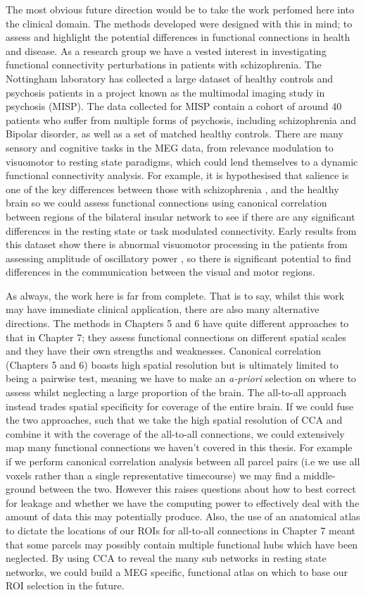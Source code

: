The most obvious future direction would be to take the work perfomed here into the clinical domain. The methods developed were designed with this in mind; to assess and highlight the potential differences in functional connections in health and disease. As a research group we have a vested interest in investigating functional connectivity perturbations in patients with schizophrenia. The Nottingham laboratory has collected a large dataset of healthy controls and psychosis patients in a project known as the multimodal imaging study in psychosis (MISP). The data collected for MISP contain a cohort of around 40 patients who suffer from multiple forms of psychosis, including schizophrenia and Bipolar disorder, as well as a set of matched healthy controls. There are many sensory and cognitive tasks in the MEG data, from relevance modulation to visuomotor to resting state paradigms, which could lend themselves to a dynamic functional connectivity analysis. For example, it is hypothesised that salience is one of the key differences between those with schizophrenia \citep{Kapur2003}, and the healthy brain so we could assess functional connections using canonical correlation between regions of the bilateral insular network to see if there are any significant differences in the resting state or task modulated connectivity. Early results from this dataset show there is abnormal visuomotor processing in the patients from assessing amplitude of oscillatory power \citep{Robson2015}, so there is significant potential to find differences in the communication between the visual and motor regions.

As always, the work here is far from complete. That is to say, whilst this work may have immediate clinical application, there are also many alternative directions. The methods in Chapters 5 and 6 have quite different approaches to that in Chapter 7; they assess functional connections on different spatial scales and they have their own strengths and weaknesses. Canonical correlation (Chapters 5 and 6) boasts high spatial resolution but is ultimately limited to being a pairwise test, meaning we have to make an \textit{a-priori} selection on where to assess whilst neglecting a large proportion of the brain. The all-to-all approach instead trades spatial specificity for coverage of the entire brain. If we could fuse the two approaches, such that we take the high spatial resolution of CCA and combine it with the coverage of the all-to-all connections, we could extensively map many functional connections we haven't covered in this thesis. For example if we perform canonical correlation analysis between all parcel pairs (i.e we use all voxels rather than a single representative timecourse) we may find a middle-ground between the two. However this raises questions about how to best correct for leakage and whether we have the computing power to effectively deal with the amount of data this may potentially produce. Also, the use of an anatomical atlas to dictate the locations of our ROIs for all-to-all connections in Chapter 7 meant that some parcels may possibly contain multiple functional hubs which have been neglected. By using CCA to reveal the many sub networks in resting state networks, we could build a MEG specific, functional atlas on which to base our ROI selection in the future.

